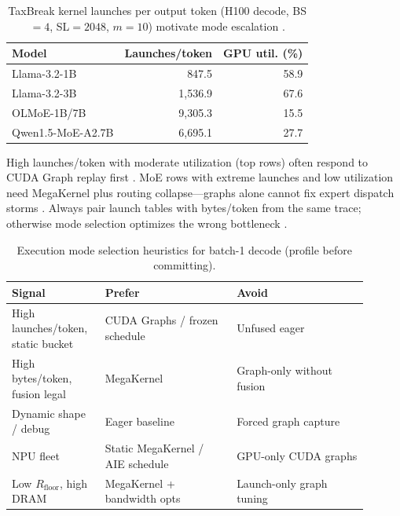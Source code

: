 \begin{table}[t]
\centering
\caption{TaxBreak kernel launches per output token (H100 decode, BS${=}4$, SL${=}2048$, $m{=}10$) motivate mode escalation \citep{taxbreak2026}.}
\label{tab:ch12_taxbreak}
\begin{tabular}{lrr}
\toprule
\textbf{Model} & \textbf{Launches/token} & \textbf{GPU util. (\%)} \\
\midrule
Llama-3.2-1B & 847.5 & 58.9 \\
Llama-3.2-3B & 1,536.9 & 67.6 \\
OLMoE-1B/7B & 9,305.3 & 15.5 \\
Qwen1.5-MoE-A2.7B & 6,695.1 & 27.7 \\
\bottomrule
\end{tabular}
\end{table}

High launches/token with moderate utilization (top rows) often respond to CUDA Graph replay first \citep{nvidia2024cudagraphs,memoryfloor2026}. MoE rows with extreme launches and low utilization need MegaKernel plus routing collapse---graphs alone cannot fix expert dispatch storms \citep{taxbreak2026,liu2024deepseekv3,yirage2026,kwon2023vllm,patel2025llminference}. Always pair launch tables with bytes/token from the same trace; otherwise mode selection optimizes the wrong bottleneck \citep{memoryfloor2026,semianalysis2024tma,amd2024xdna,chen2020compilerbasedhardw,dlbook,dao2022flashattention,dao2023flashdecoding}.

\begin{table}[t]
\centering
\caption{Execution mode selection heuristics for batch-1 decode (profile before committing).}
\label{tab:ch12_mode_select}
\begin{tabular}{p{0.22\linewidth}p{0.34\linewidth}p{0.34\linewidth}}
\toprule
\textbf{Signal} & \textbf{Prefer} & \textbf{Avoid} \\
\midrule
High launches/token, static bucket & CUDA Graphs / frozen schedule & Unfused eager \\
High bytes/token, fusion legal & MegaKernel & Graph-only without fusion \\
Dynamic shape / debug & Eager baseline & Forced graph capture \\
NPU fleet & Static MegaKernel / AIE schedule & GPU-only CUDA graphs \\
Low $R_{\mathrm{floor}}$, high DRAM & MegaKernel + bandwidth opts & Launch-only graph tuning \\
\bottomrule
\end{tabular}
\end{table}

